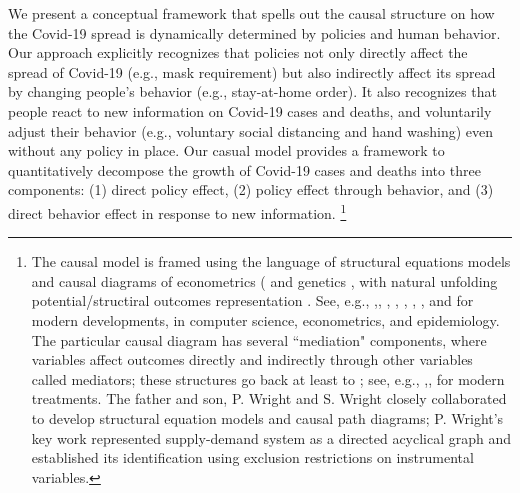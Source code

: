 \documentclass[11pt,reqno,letter]{amsart}
\theoremstyle{definition}
\begin{document}
We present a conceptual framework that spells out the causal structure on how the Covid-19 spread is dynamically determined by policies and human behavior. Our approach explicitly recognizes that policies not only directly affect the spread of Covid-19 (e.g., mask requirement) but also indirectly affect its spread by changing people's behavior (e.g., stay-at-home order). It also recognizes that people react to new information on Covid-19 cases and deaths, and voluntarily adjust their behavior (e.g., voluntary social distancing and hand washing) even without any policy in place. Our casual model provides a framework to quantitatively decompose the growth of Covid-19 cases and deaths into three components: (1) direct policy effect, (2) policy effect through behavior, and (3) direct behavior effect in response to new information. \footnote{The causal model is framed using the language of structural equations models and causal diagrams of econometrics (\cite{pwright, haavelmo:1944, tinbergen:1940, wold:1954, pearl:biometrika, heckman:pinto} and genetics \citep{wright1923}, with natural unfolding potential/structiral outcomes representation \citep{rubin1974,tinbergen1930,neyman:PO,imbens_rubin_2015}. See, e.g., \cite{pearl:biometrika},\cite{pearl:robins}, \cite{pearl:causality}, \cite{pearl:why}, \cite{white:chalak}, \cite{peters2020book}, \cite{heckman:pinto}, and \cite{hernanrobins2020book} for modern developments, in computer science, econometrics, and epidemiology. The particular causal diagram has several ``mediation" components, where variables affect outcomes directly and indirectly through other variables called mediators; these structures go back at least to \cite[][see Figure 6]{wright1923}; see, e.g., \cite{baron1986},\cite{Hines2020}, \cite{richardson:mediation} for modern treatments. The father and son, P. Wright and S. Wright closely collaborated to develop structural equation models and causal path diagrams; P. Wright's key work represented supply-demand system as a directed acyclical graph and established its identification using exclusion restrictions on instrumental variables.}
\end{document}
